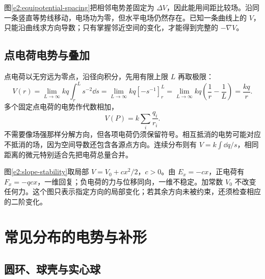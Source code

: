 图\ref{e2:equipotential-spacing}把相邻电势差固定为 $\Delta V$，因此能用间距比较场。沿同一条竖直等势线移动，电场功为零，但水平电场仍然存在。已知一条曲线上的 $V$，只能沿曲线求方向导数；只有掌握邻近空间的变化，才能得到完整的 $-\nabla V$。

\subsection{点电荷电势与叠加}

点电荷以无穷远为零点，沿径向积分，先用有限上限 $L$ 再取极限：
\[
 V(r)=\lim_{L\to\infty}kq\int_r^L s^{-2}\dd s
 =\lim_{L\to\infty}kq[-s^{-1}]_r^L
 =\lim_{L\to\infty}kq\left(\frac1r-\frac1L\right)=\frac{kq}{r}.
\]多个固定点电荷的电势作代数相加，
\[
 V(P)=k\sum_i\frac{q_i}{r_i}.
\]
不需要像场强那样分解方向，但各项电荷仍须保留符号。相互抵消的电势可能对应不抵消的场，因为空间导数还包含各源点方向。连续分布则有 $V=k\int\dd q/s$，相同距离的微元特别适合先把电荷总量合并。



图\ref{e2:slope-stability}取局部 $V=V_0+cx^2/2$，$c>0$。由 $E_x=-cx$，正电荷有 $F_x=-qcx$，一维回复；负电荷的力与位移同向，一维不稳定。加常数 $V_0$ 不改变任何力。这个图只表示指定方向的局部变化；若其余方向未被约束，还须检查相应的二阶变化。

\section{常见分布的电势与补形}
\subsection{圆环、球壳与实心球}

